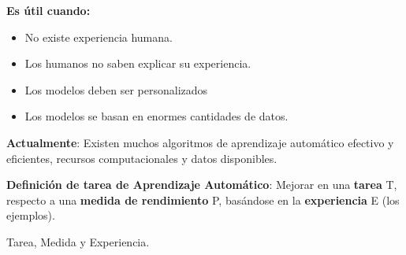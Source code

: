 \documentclass[12pt, twoside, openright]{report} %
\begin{document}
\pagebreak

\textbf{Es útil cuando:}

\begin{itemize}
	\item No existe experiencia humana.
	\item Los humanos no saben explicar su experiencia.
	\item Los modelos deben ser personalizados
	\item Los modelos se basan en enormes cantidades de datos.
\end{itemize}

\textbf{Actualmente}: Existen muchos algoritmos de aprendizaje
automático efectivo y eficientes, recursos computacionales y datos
disponibles.

\textbf{Definición de tarea de Aprendizaje Automático}: Mejorar en una
\textbf{tarea} T, respecto a una \textbf{medida de rendimiento} P,
basándose en la \textbf{experiencia} E (los ejemplos).

Tarea, Medida y Experiencia.
\end{document}
